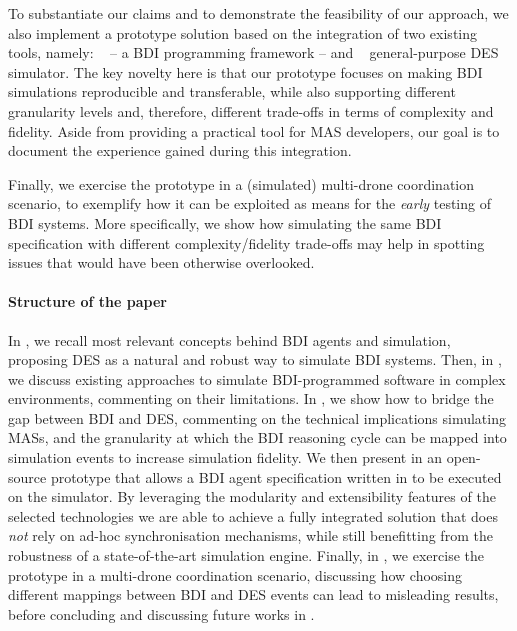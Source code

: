 To substantiate our claims and to demonstrate the feasibility of our approach,
we also implement a prototype solution based on the integration of two existing tools,
namely:
\jakta{}~\cite{BaiardiBCP23} -- a \ac{BDI} programming framework --
and
\alchemist{}~\cite{PianiniJOS2013} general-purpose \ac{DES} simulator.
%
The key novelty here is that our prototype focuses on making \ac{BDI} simulations reproducible and transferable,
while also supporting different granularity levels and, therefore, different trade-offs in terms of complexity and fidelity.
%
Aside from providing a practical tool for \ac{MAS} developers,
our goal is to document the experience gained during this integration.

Finally,
we exercise the prototype in a (simulated) multi-drone coordination scenario,
to exemplify how it can be exploited as means for the \emph{early} testing of \ac{BDI} systems.
%
More specifically,
we show how simulating the same \ac{BDI} specification with different complexity/fidelity trade-offs
may help in spotting issues that would have been otherwise overlooked.

\paragraph{Structure of the paper}

In ,
we recall most relevant concepts behind \ac{BDI} agents and simulation,
proposing \ac{DES} as a
natural and robust way to simulate \ac{BDI} systems.
%
Then, in ,
we discuss existing approaches to simulate \ac{BDI}-programmed software in complex environments,
commenting on their limitations.
%
In ,
we show how to bridge the gap between \ac{BDI} and \ac{DES},
commenting on the technical implications simulating \acp{MAS},
and the granularity at which the \ac{BDI} reasoning cycle can be mapped into simulation events to increase simulation fidelity.
%
We then present in  an open-source prototype that allows a \ac{BDI} agent specification
written in \jakta{}
to be executed on the \alchemist{} simulator.
%
By leveraging the modularity and extensibility features of the selected technologies
we are able to achieve a fully integrated solution
that does \emph{not} rely on ad-hoc synchronisation
mechanisms,
while still benefitting from the robustness of a state-of-the-art simulation engine.
%
Finally,
in ,
we exercise the prototype in a multi-drone coordination scenario,
discussing how choosing different mappings between \ac{BDI} and \ac{DES} events can lead to misleading results,
before concluding and discussing future works in .

